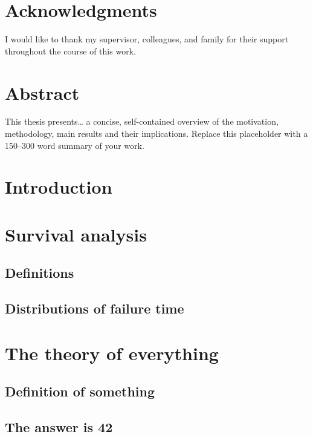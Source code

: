 \documentclass[12pt, a4paper, openany]{book}
\makeatletter
\renewcommand\mainmatter{\clearpage\@mainmattertrue\pagenumbering{arabic}}
\makeatother
\begin{document}
\chapter*{Acknowledgments}
I would like to thank my supervisor, colleagues, and family for their
support throughout the course of this work.
\clearpage

\chapter*{Abstract}
This thesis presents\ldots{} a concise, self-contained overview of the
motivation, methodology, main results and their implications.  Replace
this placeholder with a 150--300 word summary of your work.
\clearpage

\tableofcontents

\mainmatter
\chapter{Introduction}
\setcounter{page}{1}
\lipsum[1-3]

\chapter{Survival analysis}
\section{Definitions}
\lipsum[1]
\section{Distributions of failure time}
\lipsum[2]

\chapter{The theory of everything}
\section{Definition of something}
\lipsum[1]
\section{The answer is 42}
\end{document}
